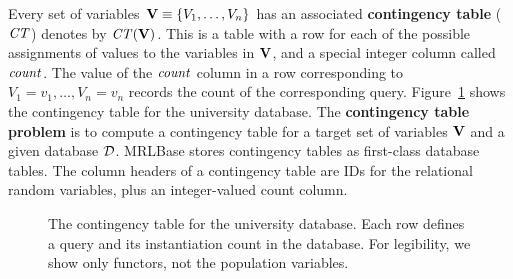 \documentclass{acm_proc_article-sp}
\begin{document}
Every set of variables $\mathbf{V} \equiv \{V_{1},\ldots,V_{n} \}$ has an associated \textbf{contingency table} ($\it{CT}$) denotes by $\it{CT}(\mathbf{V})$. %
This is a table with a row for each of the possible assignments of values to the variables in $\mathbf{V}$, and a special integer column called $\it{count}$. 
The value of the $\it{count}$ column in a row 
corresponding to $V_{1} = v_{1},\ldots,V_{n} = v_{n}$ records the count of the 
corresponding query. 
Figure~\ref{fig:ct} shows the contingency table for the university database. The \textbf{contingency table problem} is to compute a contingency table for a target set of variables $\mathbf{V} $ and a given database $\mathcal{D}$. 
MRLBase stores contingency tables as first-class database tables.
 The column headers of a contingency table are IDs for the relational random variables, plus an integer-valued count column. 



\begin{figure}[htbp]
\begin{center}
\caption{The contingency table for the university database. %
Each row defines a query and its instantiation count in the database. For legibility, we show only functors, not the population variables. %
\label{fig:ct}}
\end{center}
\end{figure}
\end{document}
